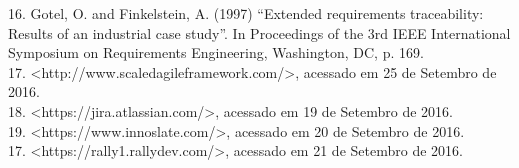16. Gotel, O. and Finkelstein, A. (1997) “Extended requirements traceability: Results of an industrial case study”. In Proceedings of the 3rd IEEE International Symposium on Requirements Engineering, Washington, DC, p. 169.\\
17. <http://www.scaledagileframework.com/>, acessado em 25 de Setembro de 2016.\\
18. <https://jira.atlassian.com/>, acessado em 19 de Setembro de 2016.\\
19. <https://www.innoslate.com/>, acessado em 20 de Setembro de 2016.\\
17. <https://rally1.rallydev.com/>, acessado em 21 de Setembro de 2016.\\
